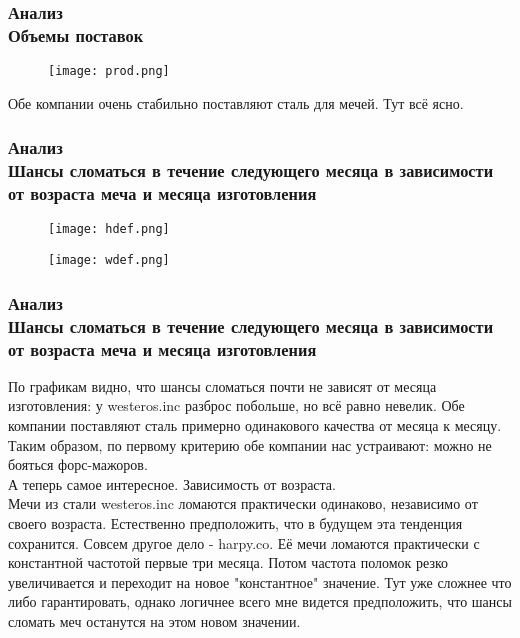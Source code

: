 \documentclass[8pt]{beamer}
\begin{document}
\begin{frame}
\frametitle{Анализ \\{\small Объемы поставок}}
\begin{figure}[h]
		\texttt{[image: prod.png]}
\end{figure}

Обе компании очень стабильно поставляют сталь для мечей. Тут всё ясно.
\end{frame}

\begin{frame}
\frametitle{Анализ\\ {\small Шансы сломаться в течение следующего месяца в зависимости от возраста меча и месяца изготовления}}
\begin{figure}[h]
		\texttt{[image: hdef.png]}
\end{figure}

\begin{figure}[h]
		\texttt{[image: wdef.png]}
\end{figure}

\end{frame}

\begin{frame}
\frametitle{Анализ\\ {\small Шансы сломаться в течение следующего месяца в зависимости от возраста меча и месяца изготовления}}
По графикам видно, что шансы сломаться почти не зависят от месяца изготовления: у westeros.inc разброс побольше, но всё равно невелик. Обе компании поставляют сталь примерно одинакового качества от месяца к месяцу. Таким образом, по первому критерию обе компании нас устраивают: можно не бояться форс-мажоров.\\
А теперь самое интересное. Зависимость от возраста.\\
Мечи из стали westeros.inc ломаются практически одинаково, независимо от своего возраста. Естественно предположить, что в будущем эта тенденция сохранится. Совсем другое дело - harpy.co. Её мечи ломаются практически с константной частотой первые три месяца. Потом частота поломок резко увеличивается и переходит на новое "константное" значение. Тут уже сложнее что либо гарантировать, однако логичнее всего мне видется предположить, что шансы сломать меч останутся на этом новом значении.
\end{frame}
\end{document}
